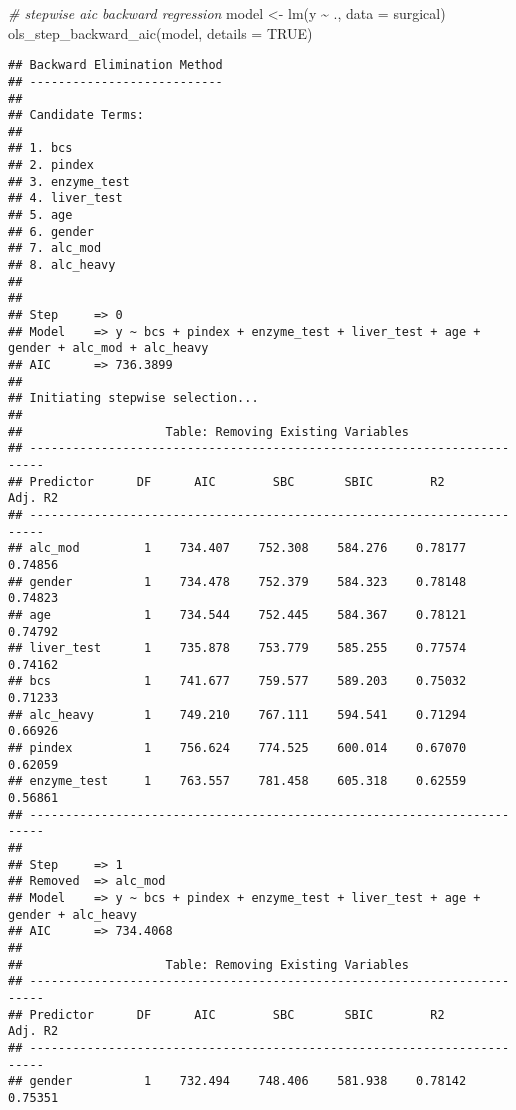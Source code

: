 \documentclass[
]{article}
\newenvironment{Shaded}{\begin{snugshade}}{\end{snugshade}}
\newcommand{\AttributeTok}[1]{\textcolor[rgb]{0.77,0.63,0.00}{#1}}
\newcommand{\CommentTok}[1]{\textcolor[rgb]{0.56,0.35,0.01}{\textit{#1}}}
\newcommand{\ConstantTok}[1]{\textcolor[rgb]{0.00,0.00,0.00}{#1}}
\newcommand{\FunctionTok}[1]{\textcolor[rgb]{0.00,0.00,0.00}{#1}}
\newcommand{\NormalTok}[1]{#1}
\newcommand{\OtherTok}[1]{\textcolor[rgb]{0.56,0.35,0.01}{#1}}
\newcommand{\SpecialCharTok}[1]{\textcolor[rgb]{0.00,0.00,0.00}{#1}}
\begin{document}
\begin{Shaded}
\begin{Highlighting}[]
\CommentTok{\# stepwise aic backward regression}
\NormalTok{model }\OtherTok{\textless{}{-}} \FunctionTok{lm}\NormalTok{(y }\SpecialCharTok{\textasciitilde{}}\NormalTok{ ., }\AttributeTok{data =}\NormalTok{ surgical)}
\FunctionTok{ols\_step\_backward\_aic}\NormalTok{(model, }\AttributeTok{details =} \ConstantTok{TRUE}\NormalTok{)}
\end{Highlighting}
\end{Shaded}

\begin{verbatim}
## Backward Elimination Method 
## ---------------------------
## 
## Candidate Terms: 
## 
## 1. bcs 
## 2. pindex 
## 3. enzyme_test 
## 4. liver_test 
## 5. age 
## 6. gender 
## 7. alc_mod 
## 8. alc_heavy 
## 
## 
## Step     => 0 
## Model    => y ~ bcs + pindex + enzyme_test + liver_test + age + gender + alc_mod + alc_heavy 
## AIC      => 736.3899 
## 
## Initiating stepwise selection... 
## 
##                    Table: Removing Existing Variables                    
## ------------------------------------------------------------------------
## Predictor      DF      AIC        SBC       SBIC        R2       Adj. R2 
## ------------------------------------------------------------------------
## alc_mod         1    734.407    752.308    584.276    0.78177    0.74856 
## gender          1    734.478    752.379    584.323    0.78148    0.74823 
## age             1    734.544    752.445    584.367    0.78121    0.74792 
## liver_test      1    735.878    753.779    585.255    0.77574    0.74162 
## bcs             1    741.677    759.577    589.203    0.75032    0.71233 
## alc_heavy       1    749.210    767.111    594.541    0.71294    0.66926 
## pindex          1    756.624    774.525    600.014    0.67070    0.62059 
## enzyme_test     1    763.557    781.458    605.318    0.62559    0.56861 
## ------------------------------------------------------------------------
## 
## Step     => 1 
## Removed  => alc_mod 
## Model    => y ~ bcs + pindex + enzyme_test + liver_test + age + gender + alc_heavy 
## AIC      => 734.4068 
## 
##                    Table: Removing Existing Variables                    
## ------------------------------------------------------------------------
## Predictor      DF      AIC        SBC       SBIC        R2       Adj. R2 
## ------------------------------------------------------------------------
## gender          1    732.494    748.406    581.938    0.78142    0.75351 

\end{verbatim}
\end{document}
